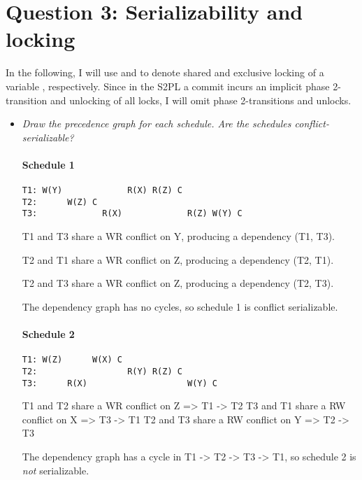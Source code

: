 \section{Question 3: Serializability and locking}

In the following, I will use  and  to denote shared and
exclusive locking of a variable , respectively. Since in the S2PL a commit
incurs an implicit phase 2-transition and unlocking of all locks, I will omit
phase 2-transitions and unlocks.

\begin{itemize}
\item \textit{Draw the precedence graph for each schedule. Are the schedules
conflict-serializable?}

\paragraph{Schedule 1}

\begin{verbatim}
T1: W(Y)             R(X) R(Z) C
T2:      W(Z) C
T3:             R(X)             R(Z) W(Y) C
\end{verbatim}

T1 and T3 share a WR conflict on Y, producing a dependency (T1, T3).
\smallskip

T2 and T1 share a WR conflict on Z, producing a dependency (T2, T1).
\smallskip

T2 and T3 share a WR conflict on Z, producing a dependency (T2, T3).


The dependency graph has no cycles, so schedule 1 is conflict serializable.

\paragraph{Schedule 2}

\begin{verbatim}
T1: W(Z)      W(X) C
T2:                  R(Y) R(Z) C
T3:      R(X)                    W(Y) C
\end{verbatim}

T1 and T2 share a WR conflict on Z => T1 -> T2
T3 and T1 share a RW conflict on X => T3 -> T1
T2 and T3 share a RW conflict on Y => T2 -> T3


The dependency graph has a cycle in T1 -> T2 -> T3 -> T1, so schedule 2 is
\textit{not} serializable.




\end{itemize}
